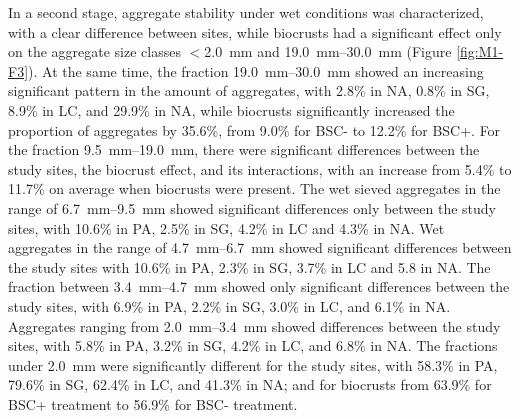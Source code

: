 In a second stage, aggregate stability under wet conditions was characterized, with a clear difference between sites, while biocrusts had a significant effect only on the aggregate size classes $<$\SI{2.0}{\milli\meter} and \SIrange[range-phrase=--,range-units=single]{19.0}{30.0}{\milli\meter} (Figure \ref{fig:M1-F3}). At the same time, the fraction \SIrange[range-phrase=--,range-units=single]{19.0}{30.0}{\milli\meter} showed an increasing significant pattern in the amount of aggregates, with 2.8\% in NA, 0.8\% in SG, 8.9\% in LC, and 29.9\% in NA, while biocrusts significantly increased the proportion of aggregates by 35.6\%, from 9.0\% for BSC- to 12.2\% for BSC+. For the fraction \SIrange[range-phrase=--,range-units=single]{9.5}{19.0}{\milli\meter}, there were significant differences between the study sites, the biocrust effect, and its interactions, with an increase from 5.4\% to 11.7\% on average when biocrusts were present. The wet sieved aggregates in the range of \SIrange[range-phrase=--,range-units=single]{6.7}{9.5}{\milli\meter} showed significant differences only between the study sites, with 10.6\% in PA, 2.5\% in SG, 4.2\% in LC and 4.3\% in NA. Wet aggregates in the range of \SIrange[range-phrase=--,range-units=single]{4.7}{6.7}{\milli\meter} showed significant differences between the study sites with 10.6\% in PA, 2.3\% in SG, 3.7\% in LC and 5.8 in NA. The fraction between \SIrange[range-phrase=--,range-units=single]{3.4}{4.7}{\milli\meter} showed only significant differences between the study sites, with 6.9\% in PA, 2.2\% in SG, 3.0\% in LC, and 6.1\% in NA. Aggregates ranging from \SIrange[range-phrase=--,range-units=single]{2.0}{3.4}{\milli\meter} showed differences between the study sites, with 5.8\% in PA, 3.2\% in SG, 4.2\% in LC, and 6.8\% in NA. The fractions under \SI{2.0}{\milli\meter} were significantly different for the study sites, with 58.3\% in PA, 79.6\% in SG, 62.4\% in LC, and 41.3\% in NA; and for biocrusts from 63.9\% for BSC+ treatment to 56.9\% for BSC- treatment.

